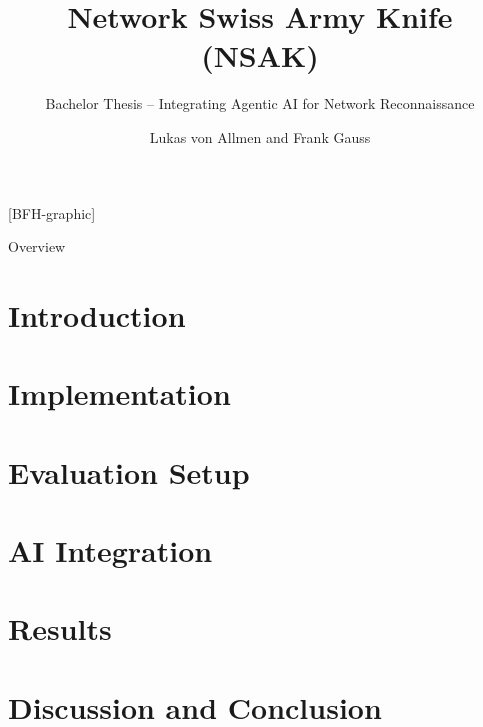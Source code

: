 \documentclass[
	ngerman,%
	authorontitle=true,
	]{bfhbeamer}
\title{Network Swiss Army Knife (NSAK) }
\subtitle{Bachelor Thesis -- Integrating Agentic AI for Network Reconnaissance}
\author[]{Lukas von Allmen and Frank Gauss}
\institute{Bern University of Applied Sciences}
\begin{document}



[BFH-graphic]
\maketitle

\AtBeginSection{\sectionpage}
\begin{frame}{Overview}
\tableofcontents
\end{frame}

\section{Introduction}\label{sec:introduction}


\section{Implementation}\label{sec:implementation}


\section{Evaluation Setup}\label{sec:evaluation-setup}


\section{AI Integration}\label{sec:ai-integration}


\section{Results}\label{sec:results}


\section{Discussion and Conclusion}\label{sec:discussion-and-conclusion}

\end{document}
